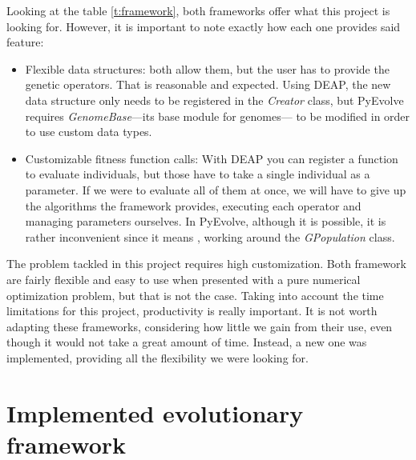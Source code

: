 Looking at the table \ref{t:framework}, both frameworks offer what this project is looking for. However, it is important to note exactly how each one provides said feature:

\begin{itemize}
	\item Flexible data structures: both allow them, but the user has to provide the genetic operators. That is reasonable and expected. Using DEAP, the new data structure only needs to be registered in the \textit{Creator} class, but PyEvolve requires \textit{GenomeBase}---its base module for genomes--- to be modified in order to use custom data types.
	\item Customizable fitness function calls: With DEAP you can register a function to evaluate individuals, but those have to take a single individual as a parameter. If we were to evaluate all of them at once, we will have to give up the algorithms the framework provides, executing each operator and managing parameters ourselves. In PyEvolve, although it is possible, it is rather inconvenient since it means , working around the \textit{GPopulation} class.
\end{itemize} 

The problem tackled in this project requires high customization. Both framework are fairly flexible and easy to use when presented with a pure numerical optimization problem, but that is not the case. Taking into account the time limitations for this project, productivity is really important. It is not worth adapting these frameworks, considering how little we gain from their use, even though it would not take a great amount of time. Instead, a new one was implemented, providing all the flexibility we were looking for.

\section{Implemented evolutionary framework}



